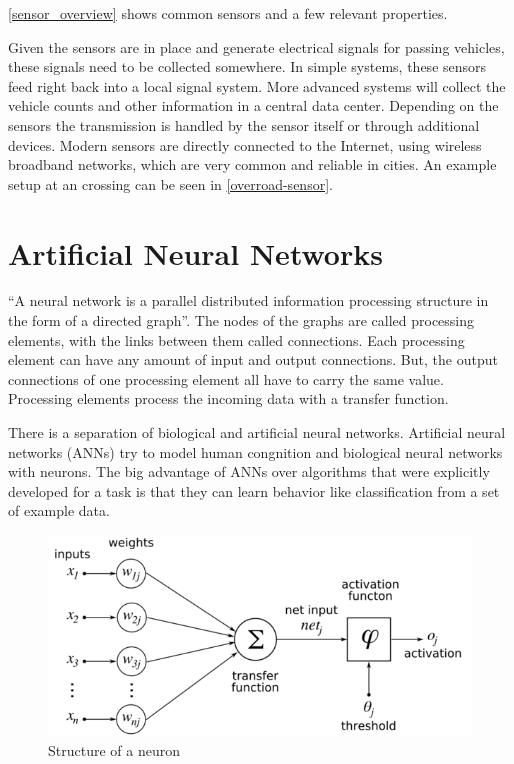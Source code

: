 
\autoref{sensor_overview} shows common sensors and a few relevant properties.

Given the sensors are in place and generate electrical signals for passing vehicles, these signals need to be collected somewhere. In simple systems, these sensors feed right back into a local signal system. More advanced systems will collect the vehicle counts and other information in a central data center. Depending on the sensors the transmission is handled by the sensor itself or through additional devices. Modern sensors are directly connected to the Internet, using wireless broadband networks, which are very common and reliable in cities. An example setup at an crossing can be seen in \autoref{overroad-sensor}.

\section{Artificial Neural Networks}
\label{sec:ann}

``A neural network is a parallel distributed information processing structure in the
form of a directed graph''. \cite{introToNNs} The nodes of the graphs are called processing elements, with the links between them called connections. Each processing element can have any amount of input and output connections. But, the output connections of one processing element all have to carry the same value. Processing elements process the incoming data with a transfer function. \cite{introToNNs}

There is a separation of biological and artificial neural networks. Artificial neural networks (ANNs) try to model human congnition and biological neural networks with neurons. \cite{logicalCalculus1943} 
The big advantage of ANNs over algorithms that were explicitly developed for a task is that they can learn behavior like classification from a set of example data. 

\begin{figure}[ht]
	\centering
  \includegraphics[width=15cm]{figures/neuron_structure}
	\caption[Structure of a neuron]{Structure of a neuron \protect\footnotemark}
	\label{neuron}
\end{figure}


